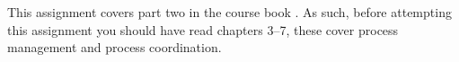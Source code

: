 This assignment covers part two in the course book 
\cite{Silberschatz2013intl,Silberschatz2013osc}.
As such, before attempting this assignment you should have read chapters 3--7, 
these cover process management and process coordination.
